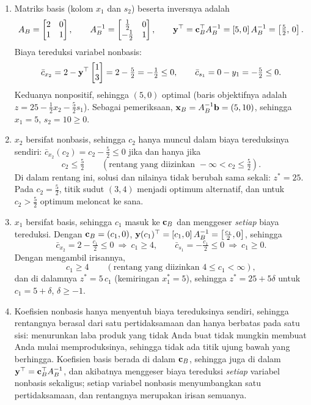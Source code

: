 \begin{enumerate}
\item Matriks basis (kolom $x_1$ dan $s_2$) beserta inversnya adalah
\[
A_B = \begin{bmatrix} 2 & 0 \\ 1 & 1 \end{bmatrix}, \qquad
A_B^{-1} = \begin{bmatrix} \tfrac12 & 0 \\ -\tfrac12 & 1 \end{bmatrix},
\qquad
\mathbf{y}^\top = \mathbf{c}_B^\top A_B^{-1} = [5, 0]\,A_B^{-1} = \left[\tfrac52,\, 0\right].
\]
Biaya tereduksi variabel nonbasis:
\[
\bar{c}_{x_2} = 2 - \mathbf{y}^\top \begin{bmatrix} 1 \\ 3 \end{bmatrix} = 2 - \tfrac52 = -\tfrac12 \le 0,
\qquad
\bar{c}_{s_1} = 0 - y_1 = -\tfrac52 \le 0 .
\]
Keduanya nonpositif, sehingga $(5,0)$ optimal (baris objektifnya adalah $z = 25 - \tfrac12 x_2 - \tfrac52 s_1$). Sebagai pemeriksaan, $\mathbf{x}_B = A_B^{-1}\mathbf{b} = (5, 10)$, sehingga $x_1 = 5$, $s_2 = 10 \ge 0$.
\item $x_2$ bersifat nonbasis, sehingga $c_2$ hanya muncul dalam biaya tereduksinya sendiri: $\bar{c}_{x_2}(c_2) = c_2 - \tfrac52 \le 0$ jika dan hanya jika
\[
\boxed{c_2 \le \tfrac52} \qquad (\text{rentang yang diizinkan } -\infty < c_2 \le \tfrac52).
\]
Di dalam rentang ini, solusi dan nilainya tidak berubah sama sekali: $z^* = 25$. Pada $c_2 = \tfrac52$, titik sudut $(3,4)$ menjadi optimum alternatif, dan untuk $c_2 > \tfrac52$ optimum meloncat ke sana.
\item $x_1$ bersifat basis, sehingga $c_1$ masuk ke $\mathbf{c}_B$ dan menggeser \emph{setiap} biaya tereduksi. Dengan $\mathbf{c}_B = (c_1, 0)$, $\mathbf{y}(c_1)^\top = [c_1, 0]\,A_B^{-1} = \left[\tfrac{c_1}{2}, 0\right]$, sehingga
\[
\bar{c}_{x_2} = 2 - \tfrac{c_1}{2} \le 0 \ \Rightarrow\ c_1 \ge 4,
\qquad
\bar{c}_{s_1} = -\tfrac{c_1}{2} \le 0 \ \Rightarrow\ c_1 \ge 0 .
\]
Dengan mengambil irisannya,
\[
\boxed{c_1 \ge 4} \qquad (\text{rentang yang diizinkan } 4 \le c_1 < \infty),
\]
dan di dalamnya $z^* = 5\,c_1$ (kemiringan $x_1^* = 5$), sehingga $z^* = 25 + 5\delta$ untuk $c_1 = 5 + \delta$, $\delta \ge -1$.
\item Koefisien nonbasis hanya menyentuh biaya tereduksinya sendiri, sehingga rentangnya berasal dari satu pertidaksamaan dan hanya berbatas pada satu sisi: menurunkan laba produk yang tidak Anda buat tidak mungkin membuat Anda mulai memproduksinya, sehingga tidak ada titik ujung bawah yang berhingga. Koefisien basis berada di dalam $\mathbf{c}_B$, sehingga juga di dalam $\mathbf{y}^\top = \mathbf{c}_B^\top A_B^{-1}$, dan akibatnya menggeser biaya tereduksi \emph{setiap} variabel nonbasis sekaligus; setiap variabel nonbasis menyumbangkan satu pertidaksamaan, dan rentangnya merupakan irisan semuanya.
\end{enumerate}


